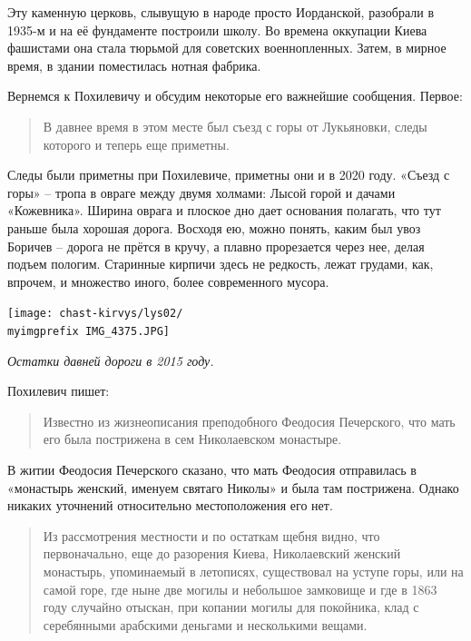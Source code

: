 Эту каменную церковь, слывущую в народе просто Иорданской, разобрали в 1935-м и на её фундаменте построили школу. Во времена оккупации Киева фашистами она стала тюрьмой для советских военнопленных. Затем, в мирное время, в здании поместилась нотная фабрика.

Вернемся к Похилевичу и обсудим некоторые его важнейшие сообщения. Первое:

\begin{quotation}
В давнее время в этом месте был съезд с горы от Лукьяновки, следы которого и теперь еще приметны.
\end{quotation}

Следы были приметны при Похилевиче, приметны они и в 2020 году. «Съезд с горы» – тропа в овраге между двумя холмами: Лысой горой и дачами «Кожевника». Ширина оврага и плоское дно дает основания полагать, что тут раньше была хорошая дорога. Восходя ею, можно понять, каким был увоз Боричев – дорога не прётся в кручу, а плавно прорезается через нее, делая подъем пологим. Старинные кирпичи здесь не редкость, лежат грудами, как, впрочем, и множество иного, более современного мусора.

\begin{center}
\texttt{[image: chast-kirvys/lys02/\\myimgprefix IMG\_4375.JPG]}

\textit{Остатки давней дороги в 2015 году.}
\end{center}

Похилевич пишет:

\begin{quotation}
Известно из жизнеописания преподобного Феодосия Печерского, что мать его была пострижена в сем Николаевском монастыре. 
\end{quotation}

В житии Феодосия Печерского сказано, что мать Феодосия отправилась в «монастырь женский, именуем святаго Николы» и была там пострижена. Однако никаких уточнений относительно местоположения его нет.

\begin{quotation}
Из рассмотрения местности и по остаткам щебня видно, что первоначально, еще до разорения Киева, Николаевский женский монастырь, упоминаемый в летописях, существовал на уступе горы, или на самой горе, где ныне две могилы и небольшое замковище и где в 1863 году случайно отыскан, при копании могилы для покойника, клад с серебянными арабскими деньгами и несколькими вещами.
\end{quotation}

